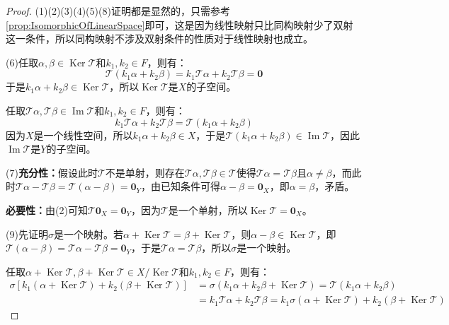 \begin{proof}
	(1)(2)(3)(4)(5)(8)证明都是显然的，只需参考\cref{prop:IsomorphicOfLinearSpace}即可，这是因为线性映射只比同构映射少了双射这一条件，所以同构映射不涉及双射条件的性质对于线性映射也成立。\par
	(6)任取$\alpha,\beta\in\operatorname{Ker}\mathcal{T}$和$k_1,k_2\in F$，则有：
	\begin{equation*}
		\mathcal{T}(k_1\alpha+k_2\beta)=k_1\mathcal{T}\alpha+k_2\mathcal{T}\beta=\mathbf{0}
	\end{equation*}
	于是$k_1\alpha+k_2\beta\in\operatorname{Ker}\mathcal{T}$，所以$\operatorname{Ker}\mathcal{T}$是$X$的子空间。\par
	任取$\mathcal{T}\alpha,\mathcal{T}\beta\in\operatorname{Im}\mathcal{T}$和$k_1,k_2\in F$，则有：
	\begin{equation*}
		k_1\mathcal{T}\alpha+k_2\mathcal{T}\beta=\mathcal{T}(k_1\alpha+k_2\beta)
	\end{equation*}
	因为$X$是一个线性空间，所以$k_1\alpha+k_2\beta\in X$，于是$\mathcal{T}(k_1\alpha+k_2\beta)\in\operatorname{Im}\mathcal{T}$，因此$\operatorname{Im}\mathcal{T}$是$Y$的子空间。\par
	(7)\textbf{充分性：}假设此时$\mathcal{T}$不是单射，则存在$\mathcal{T}\alpha,\mathcal{T}\beta\in\mathcal{T}$使得$\mathcal{T}\alpha=\mathcal{T}\beta$且$\alpha\ne\beta$，而此时$\mathcal{T}\alpha-\mathcal{T}\beta=\mathcal{T}(\alpha-\beta)=\mathbf{0}_Y$，由已知条件可得$\alpha-\beta=\mathbf{0}_X$，即$\alpha=\beta$，矛盾。\par
	\textbf{必要性：}由(2)可知$\mathcal{T}\mathbf{0}_X=\mathbf{0}_Y$，因为$\mathcal{T}$是一个单射，所以$\operatorname{Ker}\mathcal{T}=\mathbf{0}_X$。\par
	(9)先证明$\sigma$是一个映射。若$\alpha+\operatorname{Ker}\mathcal{T}=\beta+\operatorname{Ker}\mathcal{T}$，则$\alpha-\beta\in\operatorname{Ker}\mathcal{T}$，即$\mathcal{T}(\alpha-\beta)=\mathcal{T}\alpha-\mathcal{T}\beta=\mathbf{0}_Y$，于是$\mathcal{T}\alpha=\mathcal{T}\beta$，所以$\sigma$是一个映射。\par
	任取$\alpha+\operatorname{Ker}\mathcal{T},\beta+\operatorname{Ker}\mathcal{T}\in X/\operatorname{Ker}\mathcal{T}$和$k_1,k_2\in F$，则有：
	\begin{align*}
		\sigma[k_1(\alpha+\operatorname{Ker}\mathcal{T})+k_2(\beta+\operatorname{Ker}\mathcal{T})]
		&=\sigma(k_1\alpha+k_2\beta+\operatorname{Ker}\mathcal{T})
		=\mathcal{T}(k_1\alpha+k_2\beta) \\
		&=k_1\mathcal{T}\alpha+k_2\mathcal{T}\beta
		=k_1\sigma(\alpha+\operatorname{Ker}\mathcal{T})+k_2(\beta+\operatorname{Ker}\mathcal{T})

\end{align*}
\end{proof}

